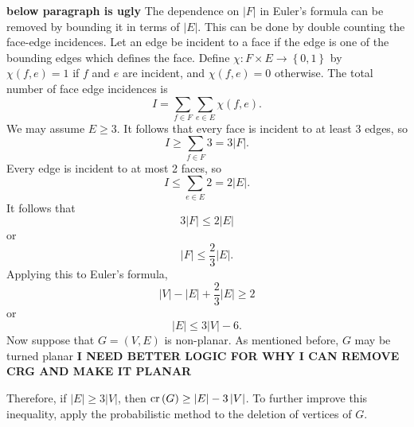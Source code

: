 \documentclass[12pt]{amsart}
\begin{document}
\textbf{below paragraph is ugly}
The dependence on \(\left\lvert F \right\rvert \) in Euler's formula can be removed by bounding
it in terms of \(\left\lvert E \right\rvert \). This can be done by double counting the face-edge
incidences. Let an edge be incident to a face if the edge is one of the bounding
edges which defines the face. Define \(\chi : F \times E \to \left\{ 0,1 \right\} \) by
\(\chi(f,e) = 1\) if \(f\) and \(e\) are incident, and \(\chi(f,e) = 0\) otherwise.
The total number of face edge incidences is
\[
    I = \sum_{f\in F} \sum _{e \in E} \chi(f,e)
.\]
We may assume \(E \geq 3\). It follows that every face is incident to at least 3 edges,
so
\[
    I \geq \sum _{f \in F} 3 = 3 \left\lvert F \right\rvert 
.\]
Every edge is incident to at most 2 faces, so
\[
    I \leq \sum _{e \in E} 2 = 2 \left\lvert E \right\rvert 
.\]
It follows that
\[
    3 \left\lvert F \right\rvert \leq 2 \left\lvert E \right\rvert 
\]
or
\[
    \left\lvert F \right\rvert \leq \frac{2}{3} \left\lvert E \right\rvert 
.\]
Applying this to Euler's formula,
\[
    \left\lvert V \right\rvert - \left\lvert E \right\rvert + \frac{2}{3} \left\lvert E \right\rvert \geq 2
\]
or
\[
    \left\lvert E \right\rvert \leq 3 \left\lvert V \right\rvert -6
.\]
Now suppose that \(G = (V,E)\) is non-planar. As mentioned before, \(G\) may be turned planar
\textbf{I NEED BETTER LOGIC FOR WHY I CAN REMOVE CRG AND MAKE IT PLANAR}


Therefore, if \(\left\lvert E \right\rvert \geq 3 \left\lvert V \right\rvert \), then \(\operatorname{cr}\left( G \right) \geq \left\lvert E \right\rvert  - 3 \left\lvert V \right\rvert \).
To further improve this inequality, apply the probabilistic method to the deletion of vertices of \(G\).
\end{document}
